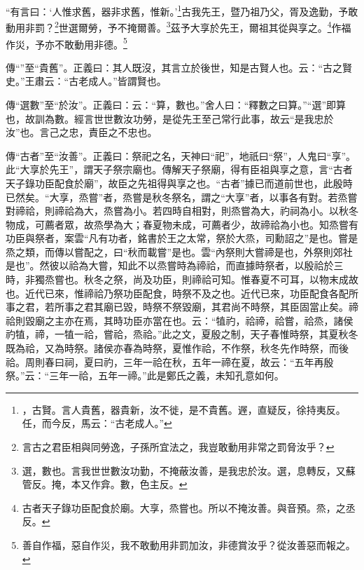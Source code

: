 “有言曰：‘人惟求舊，器非求舊，惟新。’\footnote{，古賢。言人貴舊，器貴新，汝不徙，是不貴舊。遟，直疑反，徐持夷反。任，而今反，馬云：“古老成人。”}古我先王，暨乃祖乃父，胥及逸勤，予敢動用非罰？\footnote{言古之君臣相與同勞逸，子孫所宜法之，我豈敢動用非常之罰脅汝乎？}世選爾勞，予不掩爾善。\footnote{選，數也。言我世世數汝功勤，不掩蔽汝善，是我忠於汝。選，息轉反，又蘇管反。掩，本又作弇。數，色主反。}茲予大享於先王，爾祖其從與享之。\footnote{古者天子錄功臣配食於廟。大享，烝嘗也。所以不掩汝善。與音預。烝，之丞反。}作福作災，予亦不敢動用非德。\footnote{善自作福，惡自作災，我不敢動用非罰加汝，非德賞汝乎？從汝善惡而報之。}

{\noindent\zhuan{}\fzbyks 傳“”至“貴舊”。正義曰：其人既沒，其言立於後世，知是古賢人也。云：“古之賢史。”王肅云：“古老成人。”皆謂賢也。 \par}

{\noindent\zhuan{}\fzbyks 傳“選數”至“於汝”。正義曰：云：“算，數也。”舍人曰：“釋數之曰算。”“選”即算也，故訓為數。經言世世數汝功勞，是從先王至己常行此事，故云“是我忠於汝”也。言己之忠，責臣之不忠也。 \par}

{\noindent\zhuan{}\fzbyks 傳“古者”至“汝善”。正義曰：祭祀之名，天神曰“祀”，地祇曰“祭”，人鬼曰“享”。此“大享於先王”，謂天子祭宗廟也。傳解天子祭廟，得有臣祖與享之意，言“古者天子錄功臣配食於廟”，故臣之先祖得與享之也。“古者”據已而道前世也，此殷時已然矣。“大享，烝嘗”者，烝嘗是秋冬祭名，謂之“大享”者，以事各有對。若烝嘗對禘祫，則禘祫為大，烝嘗為小。若四時自相對，則烝嘗為大，礿祠為小。以秋冬物成，可薦者眾，故烝學為大；春夏物未成，可薦者少，故禘祫為小也。知烝嘗有功臣與祭者，案雲“凡有功者，銘書於王之太常，祭於大烝，司勳詔之”是也。嘗是烝之類，而傳以嘗配之，曰“秋而載嘗”是也。雲“內祭則大嘗禘是也，外祭則郊社是也”。然彼以祫為大嘗，知此不以烝嘗時為禘祫，而直據時祭者，以殷祫於三時，非獨烝嘗也。秋冬之祭，尚及功臣，則禘祫可知。惟春夏不可耳，以物末成故也。近代已來，惟禘祫乃祭功臣配食，時祭不及之也。近代已來，功臣配食各配所事之君，若所事之君其廟已毀，時祭不祭毀廟，其君尚不時祭，其臣固當止矣。禘祫則毀廟之主亦在焉，其時功臣亦當在也。云：“犆礿，祫禘，祫嘗，祫烝，諸侯礿犆，禘，一犆一祫，嘗祫，烝祫。”此之文，夏殷之制，天子春惟時祭，其夏秋冬既為祫，又為時祭。諸侯亦春為時祭，夏惟作祫，不作祭，秋冬先作時祭，而後祫。周則春曰祠，夏曰礿，三年一祫在秋，五年一禘在夏，故云：“五年再殷祭。”云：“三年一祫，五年一禘。”此是鄭氏之義，未知孔意如何。 \par}

